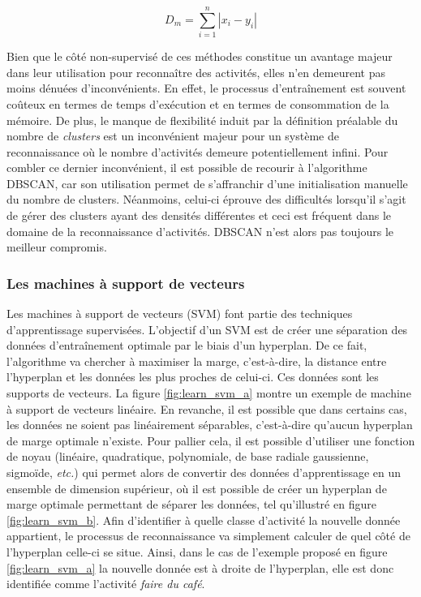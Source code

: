 \begin{equation}
	\label{eq:dist_manhattan}
	D_m = \sum_{i=1}^{n}\left|x_i-y_i\right|
\end{equation}

Bien que le côté non-supervisé de ces méthodes constitue un avantage majeur dans leur utilisation pour reconnaître des activités, elles n'en demeurent pas moins dénuées d'inconvénients. En effet, le processus d'entraînement est souvent coûteux en termes de temps d'exécution et en termes de consommation de la mémoire. De plus, le manque de flexibilité induit par la définition préalable du nombre de \textit{clusters} est un inconvénient majeur pour un système de reconnaissance où le nombre d'activités demeure potentiellement infini. Pour combler ce dernier inconvénient, il est possible de recourir à l'algorithme \ac{DBSCAN}, car son utilisation permet de s'affranchir d'une initialisation manuelle du nombre de clusters. Néanmoins, celui-ci éprouve des difficultés lorsqu'il s'agit de gérer des clusters ayant des densités différentes et ceci est fréquent dans le domaine de la reconnaissance d'activités. \acs{DBSCAN} n'est alors pas toujours le meilleur compromis.

\subsubsection{Les machines à support de vecteurs}

Les machines à support de vecteurs (\ac{SVM}) font partie des techniques d'apprentissage supervisées. L'objectif d'un \acs{SVM} est de créer une séparation des données d'entraînement optimale par le biais d'un hyperplan. De ce fait, l'algorithme va chercher à maximiser la marge, c'est-à-dire, la distance entre l'hyperplan et les données les plus proches de celui-ci. Ces données sont les supports de vecteurs. La figure \ref{fig:learn_svm_a} montre un exemple de machine à support de vecteurs linéaire. En revanche, il est possible que dans certains cas, les données ne soient pas linéairement séparables, c'est-à-dire qu'aucun hyperplan de marge optimale n'existe. Pour pallier cela, il est possible d'utiliser une fonction de noyau (linéaire, quadratique, polynomiale, de base radiale gaussienne, sigmoïde, \textit{etc.}) qui permet alors de convertir des données d'apprentissage en un ensemble de dimension supérieur, où il est possible de créer un hyperplan de marge optimale permettant de séparer les données, tel qu'illustré en figure \ref{fig:learn_svm_b}. Afin d'identifier à quelle classe d'activité la nouvelle donnée appartient, le processus de reconnaissance va simplement calculer de quel côté de l'hyperplan celle-ci se situe. Ainsi, dans le cas de l'exemple proposé en figure \ref{fig:learn_svm_a} la nouvelle donnée est à droite de l'hyperplan, elle est donc identifiée comme l'activité \og \textit{faire du café}\fg.

